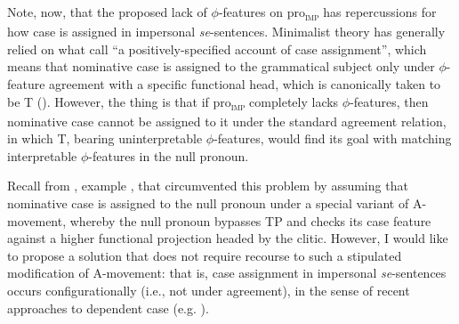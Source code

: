 \documentclass[output=paper,
modfonts,nonflat,
newtxmath
]{langsci/langscibook}
\begin{document}
Note, now, that the proposed lack of $\phi$-features on pro\textsubscript{\textsc{imp}} has repercussions for how case is assigned in impersonal \textit{se}-sentences.   Minimalist theory has generally relied on what \citet{kornfilt2015} call “a positively-specified account of case assignment'', which means that nominative case is assigned to the grammatical subject only under $\phi$-feature agreement with a specific functional head, which is canonically taken to be T (\citealt{chomsky2001}). However, the thing is that if pro\textsubscript{\textsc{imp}} completely lacks $\phi$-features, then nominative case cannot be assigned to it under the standard agreement relation, in which T, bearing uninterpretable $\phi$-features, would find its goal with matching interpretable $\phi$-features in the null pronoun. \par

Recall from , example , that \citet{riverosheppard2003} circumvented this problem by assuming that nominative case is assigned to the null pronoun under a special variant of A-movement, whereby the null pronoun  bypasses TP and checks its case feature against a higher functional projection headed by the clitic. However, I would like to propose a solution that does not require recourse to such a stipulated modification of A-movement: that is,  case assignment in impersonal \textit{se}-sentences occurs configurationally (i.e., not under agreement), in the sense of recent approaches to dependent case (e.g. \citealt{levin2015,kornfilt2015}). \par
\end{document}
